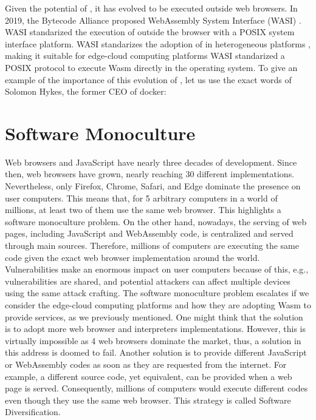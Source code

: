 Given the potential of \wasm, it has evolved to be executed outside web browsers.
In 2019, the Bytecode Alliance \cite{bytecodealliance} proposed WebAssembly System Interface (WASI) \cite{WASI}. 
WASI standarized the execution of \wasm outside the browser with a POSIX system interface platform.
WASI standarizes the adoption of \wasm in heterogeneous platforms \cite{bryant2020webassembly}, making it suitable for edge-cloud computing platforms \cite{9640153, wen2020wasmachine}
WASI standarized a POSIX protocol to execute Wasm directly in the operating system. 
To give an example of the importance of this evolution of \wasm, let us use the exact words of Solomon Hykes, the former CEO of docker: 

\vspace{0.5cm}

\begin{minipage}{0.8\linewidth}
\end{minipage}

\section{Software Monoculture}

Web browsers and JavaScript have nearly three decades of development.
Since then, web browsers have grown, nearly reaching 30 different implementations. 
Nevertheless, only Firefox, Chrome, Safari, and Edge dominate the presence on user computers.
This means that, for 5 arbitrary computers in a world of millions, at least two of them use the same web browser.
This highlights a software monoculture problem.
On the other hand, nowadays, the serving of web pages, including JavaScript and WebAssembly code, is centralized and served through main sources.
Therefore, millions of computers are executing the same code given the exact web browser implementation around the world.
Vulnerabilities make an enormous impact on user computers because of this, e.g., vulnerabilities are shared, and potential attackers can affect multiple devices using the same attack crafting.
The software monoculture problem escalates if we consider the edge-cloud computing platforms and how they are adopting Wasm to provide services, as we previously mentioned.
One might think that the solution is to adopt more web browser and interpreters implementations. 
However, this is virtually impossible as 4 web browsers dominate the market, thus, a solution in this address is doomed to fail. 
Another solution is to provide different JavaScript or WebAssembly codes as soon as they are requested from the internet. 
For example, a different source code, yet equivalent, can be provided when a web page is served. 
Consequently, millions of computers would execute different codes even though they use the same web browser.
This strategy is called Software Diversification.

